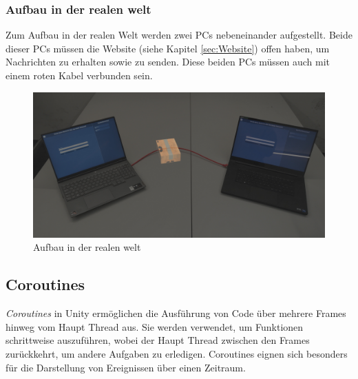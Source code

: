 \subsubsection{Aufbau in der realen welt}
Zum Aufbau in der realen Welt werden zwei PCs nebeneinander aufgestellt. Beide dieser PCs müssen die Website (siehe Kapitel \ref{sec:Website}) offen haben, um Nachrichten zu erhalten sowie zu senden. Diese beiden PCs müssen auch mit einem roten Kabel verbunden sein.
\begin{figure}[H]
    \centering
    \includegraphics[width=1\linewidth]{images/AufbauAnzeige.png}
    \caption{Aufbau in der realen welt}
    \label{fig:NachrichtenaustauschAufbau}
\end{figure}


\subsection{\label{sec:Coroutines}Coroutines}
\textit{Coroutines} in Unity ermöglichen die Ausführung von Code über mehrere Frames hinweg vom Haupt Thread aus. Sie werden verwendet, um Funktionen schrittweise auszuführen, wobei der Haupt Thread zwischen den Frames zurückkehrt, um andere Aufgaben zu erledigen. Coroutines eignen sich besonders für die Darstellung von Ereignissen über einen Zeitraum.
\\
